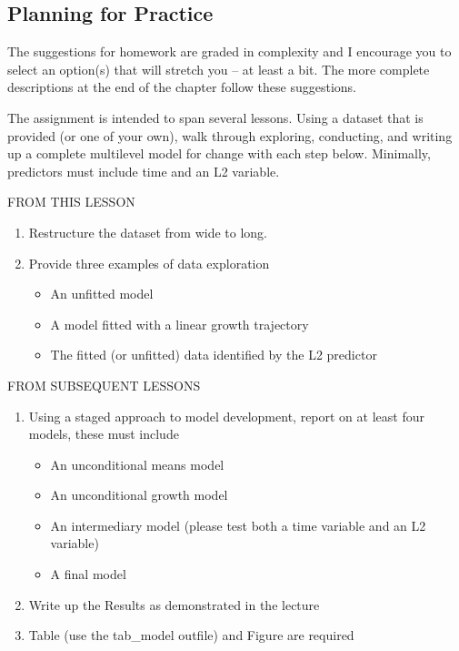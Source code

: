 \documentclass[
  english,
]{book}
\providecommand{\tightlist}{%
  \setlength{\itemsep}{0pt}\setlength{\parskip}{0pt}}
\begin{document}
\hypertarget{planning-for-practice-1}{%
\subsection{Planning for Practice}\label{planning-for-practice-1}}

The suggestions for homework are graded in complexity and I encourage you to select an option(s) that will stretch you -- at least a bit. The more complete descriptions at the end of the chapter follow these suggestions.

The assignment is intended to span several lessons. Using a dataset that is provided (or one of your own), walk through exploring, conducting, and writing up a complete multilevel model for change with each step below. Minimally, predictors must include time and an L2 variable.

FROM THIS LESSON

\begin{enumerate}
\def\labelenumi{\arabic{enumi}.}
\tightlist
\item
  Restructure the dataset from wide to long.
\item
  Provide three examples of data exploration

  \begin{itemize}
  \tightlist
  \item
    An unfitted model
  \item
    A model fitted with a linear growth trajectory
  \item
    The fitted (or unfitted) data identified by the L2 predictor
  \end{itemize}
\end{enumerate}

FROM SUBSEQUENT LESSONS

\begin{enumerate}
\def\labelenumi{\arabic{enumi}.}
\setcounter{enumi}{2}
\tightlist
\item
  Using a staged approach to model development, report on at least four models, these must include

  \begin{itemize}
  \tightlist
  \item
    An unconditional means model
  \item
    An unconditional growth model
  \item
    An intermediary model (please test both a time variable and an L2 variable)
  \item
    A final model
  \end{itemize}
\item
  Write up the Results as demonstrated in the lecture
\item
  Table (use the tab\_model outfile) and Figure are required
\end{enumerate}
\end{document}
